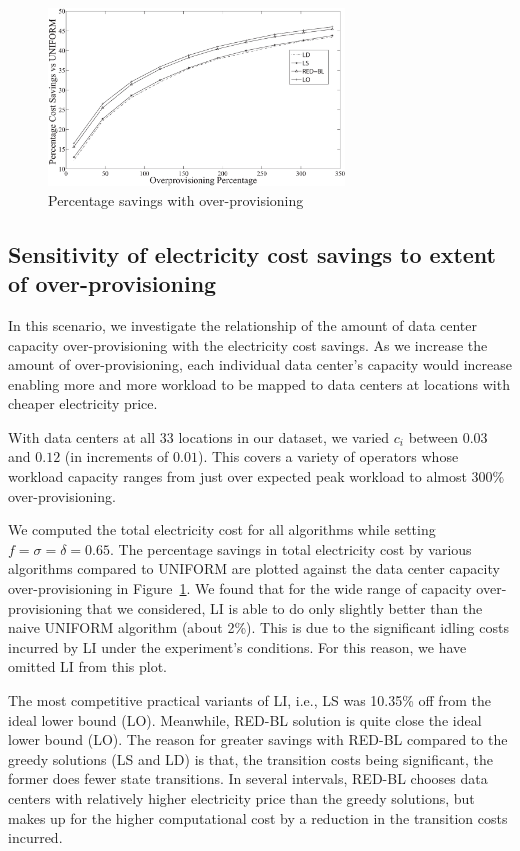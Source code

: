 \begin{figure}
\centering
\includegraphics[width=0.7\textwidth]{pics/s1vseqr.eps}
    \caption{Percentage savings with over-provisioning}
    \label{fig:s1r}
\end{figure}

\subsection{Sensitivity of electricity cost savings to extent of over-provisioning}In this scenario, we investigate the relationship of the amount of data center capacity over-provisioning with the electricity cost savings. As we increase the amount of over-provisioning, each individual data center's capacity would increase enabling more and more workload to be mapped to data centers at locations with cheaper electricity price.

With data centers at all
    $33$ locations in our dataset, we varied $c_i$ between $0.03$ and
    $0.12$ (in increments of $0.01$). This covers a variety of operators whose workload capacity ranges from just over expected peak workload to
almost $300\%$ over-provisioning.

We computed the total electricity cost for all algorithms while setting $f=\sigma=\delta=0.65$. The percentage savings in total electricity cost by various algorithms compared to UNIFORM are plotted against the data center capacity over-provisioning in Figure~\ref{fig:s1r}. We found that for the wide range of capacity over-provisioning that we considered, LI is able to do only slightly better than the naive UNIFORM algorithm (about 2\%). This is due to the significant idling costs incurred by LI under the experiment's conditions. For this reason, we have omitted LI from this plot.

The most competitive practical variants of LI, i.e., LS was 10.35\% off from the ideal lower bound (LO). Meanwhile, RED-BL solution is quite close the ideal lower bound (LO). The reason for greater savings with RED-BL compared to the greedy solutions (LS and LD) is that, the transition costs being significant, the former does fewer state transitions. In several intervals, RED-BL chooses data centers with relatively higher electricity price than the greedy solutions, but makes up for the higher computational cost by a reduction in the transition costs incurred.

